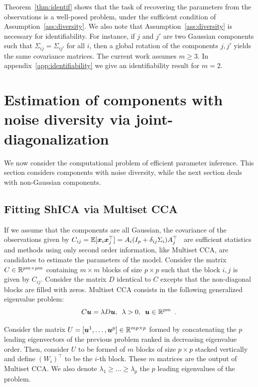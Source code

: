 Theorem~\ref{thm:identif} shows that the task of recovering the parameters from
the observations is a well-posed problem, under the sufficient condition of
Assumption~\ref{ass:diversity}.  We also note that
Assumption~\ref{ass:diversity} is necessary for identifiability. For instance,
if $j$ and $j'$ are two Gaussian components such that $\Sigma_{ij} =
\Sigma_{ij'}$ for all $i$, then a global rotation of the components $j, j'$
yields the same covariance matrices. The current work assumes $m \geq 3$. In appendix~\ref{app:identifiability} we give an identifiability result for $m=2$.



\section{Estimation of components with noise diversity via joint-diagonalization}

We now consider the computational problem of efficient parameter inference. This section considers components with noise diversity, while the next section deals with non-Gaussian components.


\subsection{Fitting ShICA via Multiset CCA}
If we assume that the components are all Gaussian, %
the covariance of the observations given by
$C_{ij}=  \mathbb{E}[\boldsymbol{x}_i\boldsymbol{x}_j^\top] = A_i(I_p + \delta_{ij}\Sigma_i)A_j^{\top}\enspace
$ are sufficient statistics and methods using only second order information, like Multiset CCA, are candidates to estimate the parameters of the model.
Consider the
matrix $C \in \mathbb{R}^{pm \times pm}$ containing $m \times m$ blocks of size $p
\times p$
such that the block $i,j$ is given by $C_{ij}$. Consider the matrix $D$ identical to $C$ excepts that the non-diagonal blocks are filled with zeros. 
Multiset CCA  consists in the following generalized eigenvalue problem:
\begin{equation}
\label{eq:eigv}
    C \boldsymbol{u} = \lambda D\boldsymbol{u},\enspace \lambda > 0,\enspace \boldsymbol{u}\in\mathbb{R}^{pm} \enspace .
\end{equation}
  
Consider the matrix $U = [\boldsymbol{u}^1, \dots, \boldsymbol{u}^p] \in \mathbb{R}^{mp \times p}$ formed by concatenating the $p$ leading eigenvectors of the previous problem ranked in decreasing eigenvalue order. Then, consider $U$ to be formed of $m$ blocks of size $p \times p$ stacked vertically and define $(W_i)^{\top}$ to be the $i$-th block. These $m$ matrices are the output of Multiset CCA. We also denote $\lambda_1 \geq \dots \geq \lambda_p$ the $p$ leading eigenvalues of the problem.

